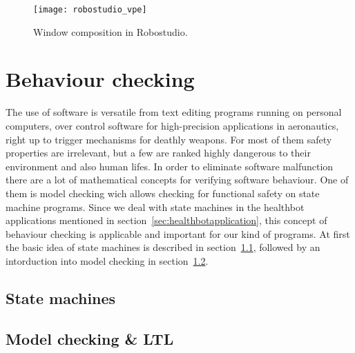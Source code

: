 \begin{figure}[htbp]
  \centering
  \texttt{[image: robostudio\_vpe]} 
  \caption{Window composition in Robostudio.}
  \label{fig:robostudio_vpe}
\end{figure}








\section{Behaviour checking}
\label{sec:behaviourchecking}

The use of software is versatile from text editing programs running on personal computers, over control software for high-precision applications in aeronautics, right up to trigger mechanisms for deathly weapons. For most of them safety properties are irrelevant, but a few are ranked highly dangerous to their environment and also human lifes. In order to eliminate software malfunction there are a lot of mathematical concepts for verifying software behaviour.
One of them is model checking wich allows checking for functional safety on state machine programs. Since we deal with state machines in the healthbot applications mentioned in section~\ref{sec:healthbotapplication}, this concept of behaviour checking is applicable and important for our kind of programs. At first the basic idea of state machines is described in section~\ref{sec:statemachines}, followed by an intorduction into model checking in section~\ref{sec:modelcheckingandltl}.


\subsection{State machines}
\label{sec:statemachines}



\subsection{Model checking \& LTL}
\label{sec:modelcheckingandltl}



